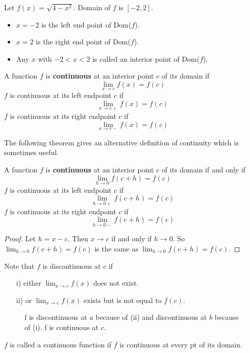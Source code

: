 \documentclass[../calc1-main.tex]{subfiles}
\begin{document}
	Let $f(x) = \sqrt{4 - x^2}$. Domain of $f$ is $[-2, 2]$.
	\begin{itemize}
		\item $x = -2$ is the left end point of Dom($f$).
		\item $x = 2$ is the right end point of Dom($f$).
		\item Any $x$ with $-2 < x < 2$ is called an interior point of Dom($f$).
	\end{itemize}

	\begin{definition}
		A function $f$ is \textbf{continuous} at an interior point $c$ of its domain if
		\[
			\lim_{x \to c} f(x) = f(c)
		\]
		$f$ is continuous at its left endpoint $c$ if
		\[
			\lim_{x \to c+} f(x) = f(c)
		\]
		$f$ is continuous at its right endpoint $c$ if
		\[
			\lim_{x \to c-} f(x) = f(c)
		\]
	\end{definition}

	The following theorem gives an alternative definition of continuity which is sometimes useful.
	\begin{theorem}\label{alternative continuity}
	A function $f$ is \textbf{continuous} at an interior point $c$ of its domain if and only if
	\[
		\lim_{h \to 0} f(c+h) = f(c)
	\]
	$f$ is continuous at its left endpoint $c$ if
	\[
		\lim_{h \to 0+} f(c+h) = f(c)
	\]
	$f$ is continuous at its right endpoint $c$ if
	\[
		\lim_{h \to 0-} f(c+h) = f(c)
	\]
\end{theorem}
\begin{proof}
	Let $h=x-c$. Then $x \to c$ if and only if $h \to 0$. So $\lim_{h \to 0} f(c+h) = f(c)$ is the same as $\lim_{h \to 0} f(c+h) = f(c)$.
\end{proof}
Note that $f$ is discontinuous at $c$ if
\begin{itemize}
	\item[i)] either $\lim_{x \to c} f(x)$ does not exist.
	\item[ii)] or $\lim_{x \to c} f(x)$ exists but is not equal to $f(c)$.
\end{itemize}

\begin{figure}[H]
	\centering
	
	\caption{f is discontinuous at $a$ because of (ii) and discontinuous at $b$ because of (i). f is continuous at $c$.}
\end{figure}

\begin{definition}
	$f$ is called a continuous function if $f$ is continuous at every pt of its domain.
\end{definition}
\end{document}

